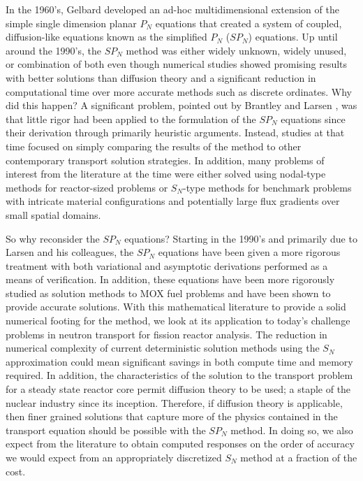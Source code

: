 In the 1960's, Gelbard developed an ad-hoc multidimensional extension
of the simple single dimension planar $P_N$ equations that created a
system of coupled, diffusion-like equations known as the simplified
$P_N$ ($SP_N$) equations. Up until around the 1990's, the $SP_N$
method was either widely unknown, widely unused, or combination of
both even though numerical studies showed promising results with
better solutions than diffusion theory and a significant reduction in
computational time over more accurate methods such as discrete
ordinates. Why did this happen? A significant problem, pointed out by
Brantley and Larsen \citep{brantley_simplified_2000}, was that little
rigor had been applied to the formulation of the $SP_N$ equations
since their derivation through primarily heuristic arguments. Instead,
studies at that time focused on simply comparing the results of the
method to other contemporary transport solution strategies. In
addition, many problems of interest from the literature at the time
were either solved using nodal-type methods for reactor-sized problems
or $S_N$-type methods for benchmark problems with intricate material
configurations and potentially large flux gradients over small spatial
domains.

So why reconsider the $SP_N$ equations? Starting in the 1990's and
primarily due to Larsen and his colleagues, the $SP_N$ equations have
been given a more rigorous treatment with both variational and
asymptotic derivations performed as a means of verification. In
addition, these equations have been more rigorously studied as
solution methods to MOX fuel problems and have been shown to provide
accurate solutions. With this mathematical literature to provide a
solid numerical footing for the method, we look at its application to
today's challenge problems in neutron transport for fission reactor
analysis. The reduction in numerical complexity of current
deterministic solution methods using the $S_N$ approximation could
mean significant savings in both compute time and memory required. In
addition, the characteristics of the solution to the transport problem
for a steady state reactor core permit diffusion theory to be used; a
staple of the nuclear industry since its inception. Therefore, if
diffusion theory is applicable, then finer grained solutions that
capture more of the physics contained in the transport equation should
be possible with the $SP_N$ method. In doing so, we also expect from
the literature to obtain computed responses on the order of accuracy
we would expect from an appropriately discretized $S_N$ method at a
fraction of the cost.

